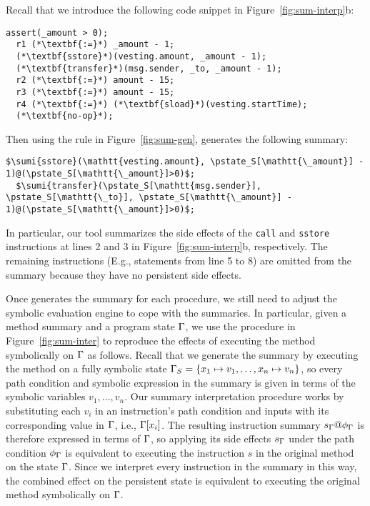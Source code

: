 \begin{example}
Recall that we introduce the following code snippet in Figure~\ref{fig:sum-interp}b:
\begin{lstlisting}[linewidth=9cm,frame=none, numbers=none]
  assert(_amount > 0);
  r1 (*\textbf{:=}*) _amount - 1;
  (*\textbf{sstore}*)(vesting.amount, _amount - 1);
  (*\textbf{transfer}*)(msg.sender, _to, _amount - 1);
  r2 (*\textbf{:=}*) amount - 15;
  r3 (*\textbf{:=}*) amount - 15;
  r4 (*\textbf{:=}*) (*\textbf{sload}*)(vesting.startTime);
  (*\textbf{no-op}*);
\end{lstlisting}
Then using the rule in Figure~\ref{fig:sum-gen}, \toolname generates the following summary: 
\begin{lstlisting}[linewidth=9cm,frame=none, numbers=none]
  $\sumi{sstore}(\mathtt{vesting.amount}, \pstate_S[\mathtt{\_amount}] - 1)@(\pstate_S[\mathtt{\_amount}]>0)$;
  $\sumi{transfer}(\pstate_S[\mathtt{msg.sender}], \pstate_S[\mathtt{\_to}], \pstate_S[\mathtt{\_amount}] - 1)@(\pstate_S[\mathtt{\_amount}]>0)$;
\end{lstlisting}
In particular, our
tool summarizes the side effects of the \texttt{call} and \texttt{sstore}
instructions at lines 2 and 3 in Figure~\ref{fig:sum-interp}b, respectively.  The remaining instructions (E.g., statements from line 5 to 8) are
omitted from the summary because they have no persistent side effects.
\end{example}

Once \toolname generates the summary for each procedure, we still need to adjust the symbolic evaluation engine to cope with the summaries. In particular, given a method summary and a program state $\Gamma$, we use the procedure in
Figure~\ref{fig:sum-inter} to reproduce the effects of executing the method
symbolically on $\Gamma$ as follows. Recall that we generate the summary by
executing the method on a fully symbolic state $\Gamma_S=\{x_1\mapsto
v_1,\ldots, x_n\mapsto v_n\}$, so every path
condition and symbolic expression in the summary is given in terms of the
symbolic variables $v_1,\ldots,v_n$. Our summary interpretation procedure works by
substituting each $v_i$ in an instruction's path condition and inputs with its
corresponding value in $\Gamma$, i.e., $\Gamma[x_i]$. The resulting instruction summary
$s_{\Gamma}@\phi_{\Gamma}$ is therefore expressed in terms of $\Gamma$, so applying its
side effects $s_{\Gamma}$ under the path condition $\phi_{\Gamma}$ is equivalent to
executing the instruction $s$ in the original method on the state $\Gamma$. 
Since we interpret every instruction in the summary in this way, the
combined effect on the persistent state is equivalent to executing the original
method symbolically on $\Gamma$.

